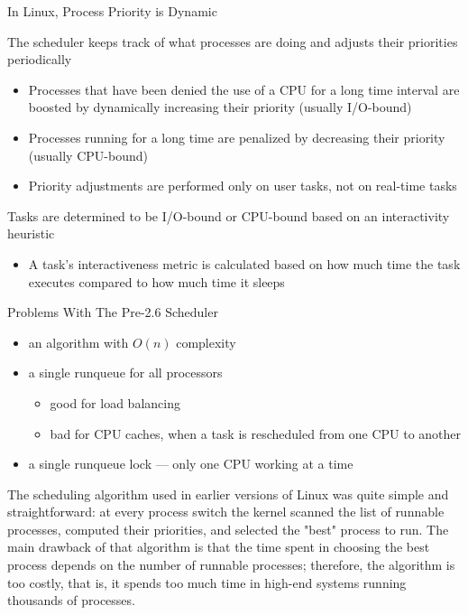 \begin{frame}{In Linux, Process Priority is Dynamic}
    \begin{block}{The scheduler keeps track of what processes are doing and adjusts their
      priorities periodically}
    \begin{itemize}
    \item Processes that have been denied the use of a CPU for a long time interval are boosted by
      dynamically increasing their priority (usually I/O-bound)
    \item Processes running for a long time are penalized by decreasing their priority (usually CPU-bound)
    \item Priority adjustments are performed only on user tasks, not on real-time tasks
    \end{itemize}
  \end{block}
  \begin{block}{Tasks are determined to be I/O-bound or CPU-bound based on an interactivity
      heuristic}
    \begin{itemize}
    \item[] A task's interactiveness metric is calculated based on how much time the task executes
      compared to how much time it sleeps
    \end{itemize}
  \end{block}
\end{frame}

\begin{frame}{Problems With The Pre-2.6 Scheduler}
  \begin{itemize}
  \item[\okay] an algorithm with $O(n)$ complexity
  \item a single runqueue for all processors
    \begin{itemize}
    \item[\good] good for load balancing
    \item[\textcolor{red}{\bad}] bad for CPU caches, when a task is rescheduled from one CPU to another
    \end{itemize}
  \item[\okay] a single runqueue lock --- only one CPU working at a time
  \end{itemize}
\end{frame}

The scheduling algorithm used in earlier versions of Linux was quite simple and
straightforward: at every process switch the kernel scanned the list of runnable
processes, computed their priorities, and selected the "best" process to run. The main
drawback of that algorithm is that the time spent in choosing the best process depends on
the number of runnable processes; therefore, the algorithm is too costly, that is, it
spends too much time in high-end systems running thousands of processes.

